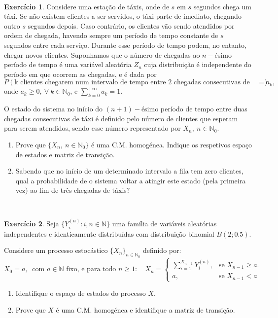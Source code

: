 \documentclass[
  11pt,
  a4paper,
]{book}
\theoremstyle{definition}
\theoremstyle{definition}
\theoremstyle{definition}
\newtheorem{exercise}{Exercício}[chapter]
\theoremstyle{definition}
\theoremstyle{remark}
\begin{document}
\(\,\)

\begin{exercise}

Considere uma estação de táxis, onde de \(s\) em \(s\) segundos chega um táxi. Se não existem clientes a ser servidos, o táxi parte de imediato, chegando outro \(s\) segundos depois. Caso contrário, os clientes vão sendo atendidos por ordem de chegada, havendo sempre um período de tempo constante de \(s\) segundos entre cada serviço. Durante esse período de tempo podem, no entanto, chegar novos clientes. Suponhamos que o número de chegadas ao \(n-\)ésimo período de tempo é uma variável aleatória \(Z_n\) cuja distribuição é independente do período em que ocorrem as chegadas, e é dada por
\[P(\text{k clientes chegarem num intervalo de tempo entre 2 chegadas consecutivas de táxi})= a_k,\]
onde \(a_k \geq 0, ~\forall ~k \in \mathbb{N}_0\), e \(\sum\limits_{k=0}^{+\infty}a_k=1\).

O estado do sistema no início do \((n+1)-\)ésimo período de tempo entre duas chegadas consecutivas de táxi é definido pelo número de clientes que esperam para serem atendidos, sendo esse número representado por \(X_n, ~n \in \mathbb{N}_0\).

\begin{enumerate}
\def\labelenumi{(\alph{enumi})}
\item
  Prove que \(\{X_n, ~n \in \mathbb{N}_0\}\) é uma C.M. homogénea. Indique os respetivos espaço de estados e matriz de transição.
\item
  Sabendo que no início de um determinado intervalo a fila tem zero clientes, qual a probabilidade de o sistema voltar a atingir este estado (pela primeira vez) ao fim de três chegadas de táxis?
\end{enumerate}

\end{exercise}

\(\,\)

\begin{exercise}

Seja \(\{Y_i^{(n)} : i, n \in \mathbb{N} \}\) uma família de variáveis aleatórias independentes e identicamente distribuídas com distribuição binomial \(B(2; 0.5)\).

Considere um processo estocástico \(\{X_n\}_{n \in \mathbb{N}_0}\) definido por:
\[
X_0 = a, ~\text{ com } a \in \mathbb{N} \text{ fixo, e para todo } n \geq 1:
\quad X_n =
\begin{cases}
\sum\limits_{i=1}^{X_{n-1}} Y_i^{(n)}, & \text{se } X_{n-1} \geq a. \\
a, & \text{se } X_{n-1} < a
\end{cases}
\]

\begin{enumerate}
\def\labelenumi{(\alph{enumi})}
\item
  Identifique o espaço de estados do processo \(X\).
\item
  Prove que \(X\) é uma C.M. homogénea e identifique a matriz de transição.
\end{enumerate}

\end{exercise}
\end{document}
